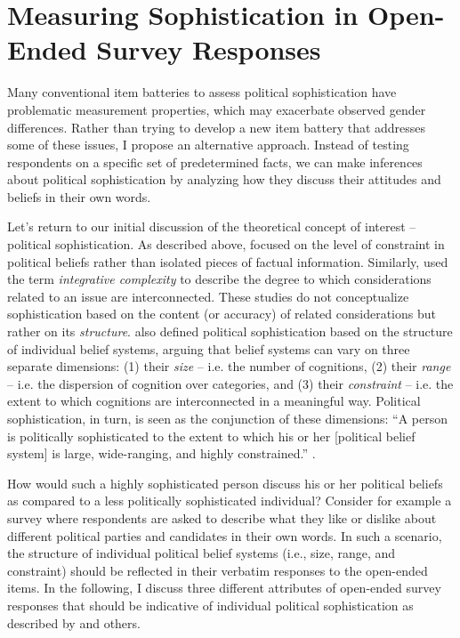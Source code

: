 \documentclass[12pt]{article}
\begin{document}
\section*{Measuring Sophistication in Open-Ended Survey Responses}

Many conventional item batteries to assess political sophistication have problematic measurement properties, which may exacerbate observed gender differences. Rather than trying to develop a new item battery that addresses some of these issues, I propose an alternative approach. Instead of testing respondents on a specific set of predetermined facts, we can make inferences about political sophistication by analyzing how they discuss their attitudes and beliefs in their own words.

Let's return to our initial discussion of the theoretical concept of interest -- political sophistication. As described above, \citet{converse1964nature} focused on the level of constraint in political beliefs rather than isolated pieces of factual information. Similarly, \citet{tetlock1983cognitive} used the term \textsl{integrative complexity} to describe the degree to which considerations related to an issue are interconnected. These studies do not conceptualize sophistication based on the content (or accuracy) of related considerations but rather on its \textsl{structure}. \citet{luskin1987measuring} also defined political sophistication based on the structure of individual belief systems, arguing that belief systems can vary on three separate dimensions: (1) their \textsl{size} -- i.e. the number of cognitions, (2) their \textsl{range} -- i.e. the dispersion of cognition over categories, and (3) their \textsl{constraint} -- i.e. the extent to which cognitions are interconnected in a meaningful way. Political sophistication, in turn, is seen as the conjunction of these dimensions: ``A person is politically sophisticated to the extent to which his or her [political belief system] is large, wide-ranging, and highly constrained.'' \citep[860]{luskin1987measuring}.

How would such a highly sophisticated person discuss his or her political beliefs as compared to a less politically sophisticated individual? Consider for example a survey where respondents are asked to describe what they like or dislike about different political parties and candidates in their own words. In such a scenario, the structure of individual political belief systems (i.e., size, range, and constraint) should be reflected in their verbatim responses to the open-ended items. In the following, I discuss three different attributes of open-ended survey responses that should be indicative of individual political sophistication as described by \citet{luskin1987measuring} and others.
\end{document}
